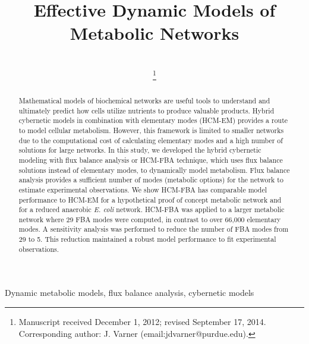 \documentclass[10pt,twocolumn,twoside,final]{IEEEtran}
\begin{document}
\title{Effective Dynamic Models of Metabolic Networks}


\author{\\
\thanks{Manuscript received December 1, 2012; revised September 17, 2014.
Corresponding author: J. Varner (email:jdvarner@purdue.edu).}}

\maketitle

\begin{abstract}
Mathematical models of biochemical networks are useful tools to understand and ultimately predict how cells utilize nutrients to produce valuable products.
Hybrid cybernetic models in combination with elementary modes (HCM-EM) provides a route to model cellular metabolism.
However, this framework is limited to smaller networks due to the computational cost of calculating elementary modes and a high number of solutions for large networks.
In this study, we developed the hybrid cybernetic modeling with flux balance analysis or HCM-FBA technique, which uses flux balance solutions instead of elementary modes,
to dynamically model metabolism.
Flux balance analysis provides a sufficient number of modes (metabolic options) for the network to estimate experimental observations.
We show HCM-FBA has comparable model performance to HCM-EM for a hypothetical proof of concept metabolic network and for a reduced anaerobic \textit{E. coli} network.
HCM-FBA was applied to a larger metabolic network where 29 FBA modes were computed, in contrast to over 66,000 elementary modes.  A sensitivity analysis was performed to reduce the number of FBA modes from 29 to 5. This reduction maintained a robust model performance to fit experimental observations.

\end{abstract}


\begin{IEEEkeywords}
Dynamic metabolic models, flux balance analysis, cybernetic models
\end{IEEEkeywords}
\end{document}
